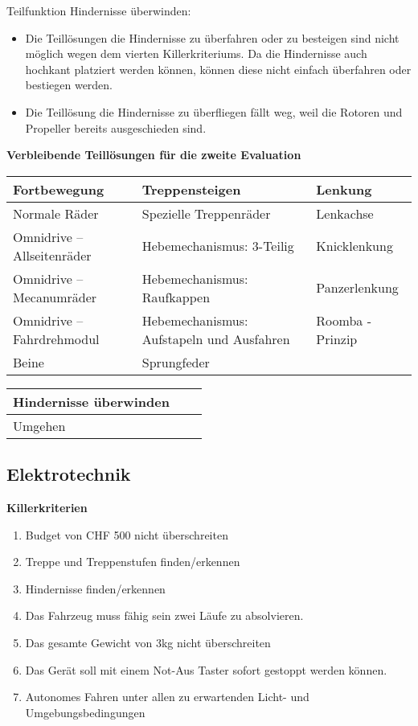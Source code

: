 Teilfunktion Hindernisse überwinden:
\begin{itemize}
    \item Die Teillösungen die Hindernisse zu überfahren oder zu besteigen sind nicht möglich wegen dem vierten Killerkriteriums. Da die Hindernisse auch hochkant platziert werden können, können diese nicht einfach überfahren oder bestiegen werden.
    \item Die Teillösung die Hindernisse zu überfliegen fällt weg, weil die Rotoren und Propeller bereits ausgeschieden sind.
 \end{itemize}

\textbf{Verbleibende Teillösungen für die zweite Evaluation}

\begin{longtable}[h]{l p{7cm} l}
\textbf{Fortbewegung} & \textbf{Treppensteigen} & \textbf{Lenkung} 
\tabularnewline
\endhead
Normale Räder & Spezielle Treppenräder & Lenkachse 
\tabularnewline
Omnidrive – Allseitenräder & Hebemechanismus: 3-Teilig & Knicklenkung 
\tabularnewline
Omnidrive – Mecanumräder & Hebemechanismus: Raufkappen & Panzerlenkung 
\tabularnewline
Omnidrive – Fahrdrehmodul & Hebemechanismus: Aufstapeln und Ausfahren & Roomba - Prinzip 
\tabularnewline
Beine & Sprungfeder &
\end{longtable}

\begin{longtable}[h]{l p{7cm} l}
\textbf{Hindernisse überwinden} 
\tabularnewline
\endhead
Umgehen
\end{longtable}
\newpage


\subsection{Elektrotechnik}
\textbf{Killerkriterien}
\begin{enumerate} 
    \item Budget von CHF 500 nicht überschreiten
	\item Treppe und Treppenstufen finden/erkennen
	\item Hindernisse finden/erkennen
	\item Das Fahrzeug muss fähig sein zwei Läufe zu absolvieren.
	\item Das gesamte Gewicht von 3kg nicht überschreiten
	\item Das Gerät soll mit einem Not-Aus Taster sofort gestoppt werden können. 
	\item Autonomes Fahren unter allen zu erwartenden Licht- und Umgebungsbedingungen 
\end{enumerate}


